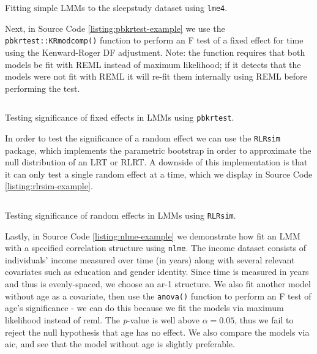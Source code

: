 \documentclass{report}
\begin{document}
\begin{listing}[h!]
\inputminted{r}{Example-Code/lme4_random_slopes.R}
\caption{Fitting simple LMMs to the sleepstudy dataset using \texttt{lme4}.}
\label{listing:lme4-example}
\end{listing}

Next, in Source Code \ref{listing:pbkrtest-example} we use the \texttt{pbkrtest::KRmodcomp()} function to perform an F test of a fixed effect for time using the Kenward-Roger DF adjustment. Note: the function requires that both models be fit with REML instead of maximum likelihood; if it detects that the models were not fit with REML it will re-fit them internally using REML before performing the test. 

\begin{listing}[h!]
\inputminted{r}{Example-Code/lme4_kr_comparison.R}
\caption{Testing significance of fixed effects in LMMs using \texttt{pbkrtest}.}
\label{listing:pbkrtest-example}
\end{listing}

In order to test the significance of a random effect we can use the \texttt{RLRsim} package, which implements the parametric bootstrap in order to approximate the null distribution of an LRT or RLRT. A downside of this implementation is that it can only test a single random effect at a time, which we display in Source Code \ref{listing:rlrsim-example}. 

\begin{listing}[h!]
\inputminted{r}{Example-Code/lme4_rlrt.R}
\caption{Testing significance of random effects in LMMs using \texttt{RLRsim}.}
\label{listing:rlrsim-example}
\end{listing}

Lastly, in Source Code \ref{listing:nlme-example} we demonstrate how fit an LMM with a specified correlation structure using \texttt{nlme}. The income dataset consists of individuals' income measured over time (in years) along with several relevant covariates such as education and gender identity. Since time is measured in years and thus is evenly-spaced, we choose an \gls{ar}-1 structure. We also fit another model without age as a covariate, then use the \texttt{anova()} function to perform an F test of age's significance - we can do this because we fit the models via maximum likelihood instead of \gls{reml}. The \textit{p}-value is well above $\alpha = 0.05$, thus we fail to reject the null hypothesis that age has no effect. We also compare the models via \gls{aic}, and see that the model without age is slightly preferable. 
\end{document}
